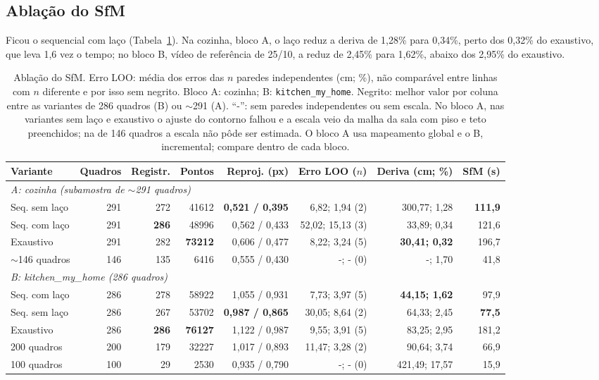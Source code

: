 \subsection{Ablação do SfM}
Ficou o sequencial com laço (Tabela~\ref{tab:ablacao}). Na cozinha, bloco A, o laço reduz a deriva de 1,28\% para 0,34\%, perto dos 0,32\% do exaustivo, que leva 1,6 vez o tempo; no bloco B, vídeo de referência de 25/10, a reduz de 2,45\% para 1,62\%, abaixo dos 2,95\% do exaustivo.

\begin{table}[!htbp]
\centering
\scriptsize
\setlength{\tabcolsep}{2.5pt}
\caption{Ablação do SfM. Erro LOO: média dos erros das $n$ paredes independentes (cm; \%), não comparável entre linhas com $n$ diferente e por isso sem negrito. Bloco A: cozinha; B: \texttt{kitchen\_my\_home}. Negrito: melhor valor por coluna entre as variantes de 286 quadros (B) ou $\sim$291 (A). ``-'': sem paredes independentes ou sem escala. No bloco A, nas variantes sem laço e exaustivo o ajuste do contorno falhou e a escala veio da malha da sala com piso e teto preenchidos; na de 146 quadros a escala não pôde ser estimada. O bloco A usa mapeamento global e o B, incremental; compare dentro de cada bloco.}
\label{tab:ablacao}
\begin{tabular}{lrrrrrrr}
\toprule
Variante & Quadros & Registr. & Pontos & Reproj. (px) & Erro LOO ($n$) & Deriva (cm; \%) & SfM (s) \\
\midrule
\multicolumn{8}{l}{\textit{A: cozinha (subamostra de $\sim$291 quadros)}} \\
Seq. sem laço & 291 & 272 & 41612 & \textbf{0,521 / 0,395} & 6,82; 1,94 (2) & 300,77; 1,28 & \textbf{111,9} \\
Seq. com laço & 291 & \textbf{286} & 48996 & 0,562 / 0,433 & 52,02; 15,13 (3) & 33,89; 0,34 & 121,6 \\
Exaustivo & 291 & 282 & \textbf{73212} & 0,606 / 0,477 & 8,22; 3,24 (5) & \textbf{30,41; 0,32} & 196,7 \\
$\sim$146 quadros & 146 & 135 & 6416 & 0,555 / 0,430 & -; - (0) & -; 1,70 & 41,8 \\
\midrule
\multicolumn{8}{l}{\textit{B: kitchen\_my\_home (286 quadros)}} \\
Seq. com laço & 286 & 278 & 58922 & 1,055 / 0,931 & 7,73; 3,97 (5) & \textbf{44,15; 1,62} & 97,9 \\
Seq. sem laço & 286 & 267 & 53702 & \textbf{0,987 / 0,865} & 30,05; 8,64 (2) & 64,33; 2,45 & \textbf{77,5} \\
Exaustivo & 286 & \textbf{286} & \textbf{76127} & 1,122 / 0,987 & 9,55; 3,91 (5) & 83,25; 2,95 & 181,2 \\
200 quadros & 200 & 179 & 32227 & 1,017 / 0,893 & 11,47; 3,28 (2) & 90,64; 3,74 & 66,9 \\
100 quadros & 100 & 29 & 2530 & 0,935 / 0,790 & -; - (0) & 421,49; 17,57 & 15,9 \\
\bottomrule
\end{tabular}
\end{table}

